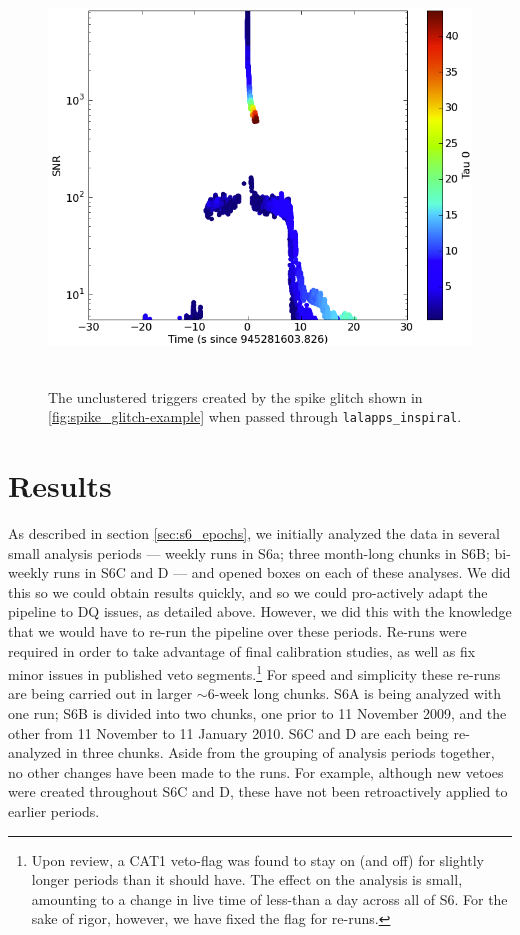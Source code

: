 \begin{figure}[hp]
\center
\includegraphics[height=4in]{figures/spike_glitch/L1_945281603.png}
\label{fig:spike_glitch-cbc_response}
\caption{The unclustered triggers created by the spike glitch shown in
\ref{fig:spike_glitch-example} when passed through \texttt{lalapps\_inspiral}.}
\end{figure}

\section{Results}

As described in section \ref{sec:s6_epochs}, we initially analyzed the data in
several small analysis periods --- weekly runs in S6a; three month-long chunks
in S6B; bi-weekly runs in S6C and D --- and opened boxes on each of these
analyses. We did this so we could obtain results quickly, and so we could
pro-actively adapt the pipeline to \ac{DQ} issues, as detailed above. However,
we did this with the knowledge that we would have to re-run the pipeline over
these periods. Re-runs were required in order to take advantage of final
calibration studies, as well as fix minor issues in published veto
segments.\footnote{Upon review, a CAT1 veto-flag was found to stay on (and off)
for slightly longer periods than it should have. The effect on the analysis is
small, amounting to a change in live time of less-than a day across all of S6.
For the sake of rigor, however, we have fixed the flag for re-runs.} For speed
and simplicity these re-runs are being carried out in larger $\sim6$-week long
chunks.  S6A is being analyzed with one run; S6B is divided into two chunks,
one prior to 11 November 2009, and the other from 11 November to 11 January
2010. S6C and D are each being re-analyzed in three chunks. Aside from the
grouping of analysis periods together, no other changes have been made to the
runs. For example, although new vetoes were created throughout S6C and D, these
have not been retroactively applied to earlier periods.

